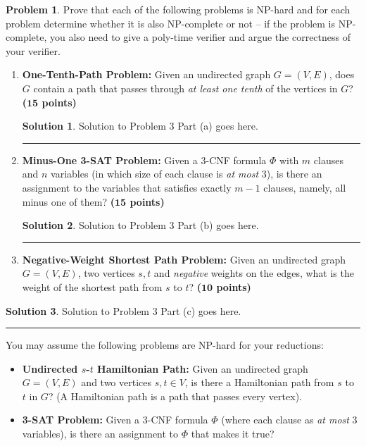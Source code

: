 \documentclass{article}
\theoremstyle{definition}
\newtheorem{problem}{Problem}
\def\fline{\rule{0.75\linewidth}{0.5pt}}
\newcommand{\finishline}{\begin{center}\fline\end{center}}
\newtheorem*{solution*}{Solution}
\newenvironment{solution}{\begin{solution*}}{{\finishline} \end{solution*}}
\newcommand{\grade}[1]{\hfill{\textbf{($\mathbf{#1}$ points)}}}
\begin{document}
\begin{problem}
Prove that each of the following problems is NP-hard and for each problem determine whether it is also NP-complete or not -- if the problem is NP-complete, you also need to give a poly-time verifier and argue the correctness of your verifier. 

\begin{enumerate}[label=(\alph*)]
\item \textbf{One-Tenth-Path Problem:} Given an undirected graph $G=(V,E)$, does $G$ contain a path that passes through \emph{at least one tenth}  of the vertices in $G$? \grade{15}

\bigskip

\begin{solution}
	Solution to Problem 3 Part (a) goes here. 
\end{solution}

	\item \textbf{Minus-One 3-SAT Problem:} Given a 3-CNF formula $\Phi$ with $m$ clauses and $n$ variables (in which size of each clause is \emph{at most} $3$), is there an assignment to the variables that satisfies exactly $m-1$ clauses, namely, all minus one of them?  \grade{15}

\bigskip

\begin{solution}
	Solution to Problem 3 Part (b) goes here. 
\end{solution}

	 \item \textbf{Negative-Weight Shortest Path Problem:} Given an undirected graph $G=(V,E)$, two vertices $s,t$ and \emph{negative} weights on the edges, what is the weight of the shortest path from $s$ to $t$? \grade{10}
\end{enumerate}

\bigskip

\begin{solution}
	Solution to Problem 3 Part (c) goes here. 
\end{solution}

You may assume the following problems are NP-hard for your reductions: 
\begin{itemize}
	\item \textbf{Undirected $s$-$t$ Hamiltonian Path:} Given an undirected graph $G=(V,E)$ and two vertices $s,t \in V$, is there a Hamiltonian path from $s$ to $t$ in $G$? (A Hamiltonian path is a path that passes every vertex). 
	\item \textbf{3-SAT Problem:} Given a 3-CNF formula $\Phi$  (where each clause as \emph{at most} $3$ variables), is there an assignment to $\Phi$ that makes it true?
\end{itemize}

\end{problem}
\end{document}
